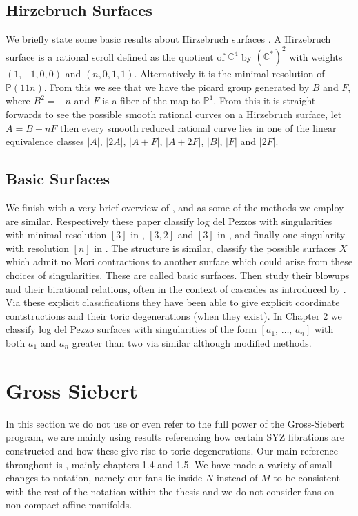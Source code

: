 \documentclass[12pt,a4paper]{book}      %
\theoremstyle{definition}
\newcommand{\mb}[1]{\mathbb{#1}}
\begin{document}
\subsection{Hirzebruch Surfaces} %
We briefly state some basic results about Hirzebruch surfaces \cite{Park}. A Hirzebruch surface is a rational scroll defined as the quotient of $\mb{C}^4$ by $(\mb{C}^*)^2$ with weights $(1,-1,0,0)$ and $(n, 0, 1,1)$. Alternatively it is the minimal resolution of $\mb{P}(11n)$. From this we see that we have the picard group generated by $B$ and $F$, where $B^2 = -n$ and $F$ is a fiber of the map to $\mb{P}^1$. From this it is straight forwards to see the possible smooth rational curves on a Hirzebruch surface, let $A = B+ nF$ then every smooth reduced rational curve lies in one of the linear equivalence classes $|A|$, $|2A|$, $|A+F|$, $|A+2F|$, $|B|$, $|F|$ and $|2F|$. 
\subsection{Basic Surfaces}
We finish with a very brief overview of \cite{CortiHeu}, \cite{Cuzzucoli} and \cite{CaveyPrince} as some of the methods we employ are similar. Respectively these paper classify log del Pezzos with singularities with minimal resolution $[3]$ in \cite{CortiHeu}, $[3,2]$ and $[3]$ in \cite{Cuzzucoli}, and finally one singularity with resolution $[n]$ in \cite{CaveyPrince}. The structure is similar, classify the possible surfaces $X$ which admit no Mori contractions to another surface which could arise from these choices of singularities. These are called basic surfaces. Then study their blowups and their birational relations, often in the context of cascades as introduced by \cite{ReidSuzuki}. Via these explicit classifications they have been able to give explicit coordinate contstructions and their toric degenerations (when they exist). In Chapter 2 we classify log del Pezzo surfaces with singularities of the form $[a_1, \, \dots ,   \, a_n]$ with both $a_1$ and $a_n$ greater than two via similar although modified methods.


\section{Gross Siebert}\label{GrossSec}

In this section we do not use or even refer to the full power of the Gross-Siebert program, we are mainly using results referencing how certain SYZ fibrations are constructed and how these give rise to toric degenerations. Our main reference throughout is \cite{GrossBook}, mainly chapters 1.4 and 1.5. We have made a variety of small changes to notation, namely our fans lie inside $N$ instead of $M$ to be consistent with the rest of the notation within the thesis and we do not consider fans on non compact affine manifolds.
\end{document}
